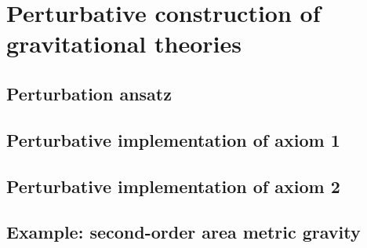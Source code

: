 \chapter{Perturbative construction of gravitational theories}

\section{Perturbation ansatz}

\section{Perturbative implementation of axiom 1}

\section{Perturbative implementation of axiom 2}

\section{Example: second-order area metric gravity}
